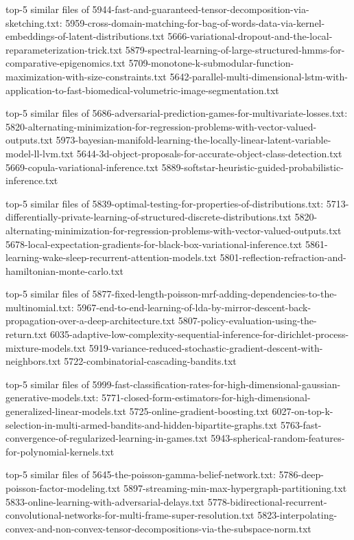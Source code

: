 \documentclass[11pt]{article}
\begin{document}
top-5 similar files of
5944-fast-and-guaranteed-tensor-decomposition-via-sketching.txt:
5959-cross-domain-matching-for-bag-of-words-data-via-kernel-embeddings-of-latent-distributions.txt
5666-variational-dropout-and-the-local-reparameterization-trick.txt
5879-spectral-learning-of-large-structured-hmms-for-comparative-epigenomics.txt
5709-monotone-k-submodular-function-maximization-with-size-constraints.txt
5642-parallel-multi-dimensional-lstm-with-application-to-fast-biomedical-volumetric-image-segmentation.txt

top-5 similar files of
5686-adversarial-prediction-games-for-multivariate-losses.txt:
5820-alternating-minimization-for-regression-problems-with-vector-valued-outputs.txt
5973-bayesian-manifold-learning-the-locally-linear-latent-variable-model-ll-lvm.txt
5644-3d-object-proposals-for-accurate-object-class-detection.txt
5669-copula-variational-inference.txt
5889-softstar-heuristic-guided-probabilistic-inference.txt

top-5 similar files of
5839-optimal-testing-for-properties-of-distributions.txt:
5713-differentially-private-learning-of-structured-discrete-distributions.txt
5820-alternating-minimization-for-regression-problems-with-vector-valued-outputs.txt
5678-local-expectation-gradients-for-black-box-variational-inference.txt
5861-learning-wake-sleep-recurrent-attention-models.txt
5801-reflection-refraction-and-hamiltonian-monte-carlo.txt

top-5 similar files of
5877-fixed-length-poisson-mrf-adding-dependencies-to-the-multinomial.txt:
5967-end-to-end-learning-of-lda-by-mirror-descent-back-propagation-over-a-deep-architecture.txt
5807-policy-evaluation-using-the-return.txt
6035-adaptive-low-complexity-sequential-inference-for-dirichlet-process-mixture-models.txt
5919-variance-reduced-stochastic-gradient-descent-with-neighbors.txt
5722-combinatorial-cascading-bandits.txt

top-5 similar files of
5999-fast-classification-rates-for-high-dimensional-gaussian-generative-models.txt:
5771-closed-form-estimators-for-high-dimensional-generalized-linear-models.txt
5725-online-gradient-boosting.txt
6027-on-top-k-selection-in-multi-armed-bandits-and-hidden-bipartite-graphs.txt
5763-fast-convergence-of-regularized-learning-in-games.txt
5943-spherical-random-features-for-polynomial-kernels.txt

top-5 similar files of 5645-the-poisson-gamma-belief-network.txt:
5786-deep-poisson-factor-modeling.txt
5897-streaming-min-max-hypergraph-partitioning.txt
5833-online-learning-with-adversarial-delays.txt
5778-bidirectional-recurrent-convolutional-networks-for-multi-frame-super-resolution.txt
5823-interpolating-convex-and-non-convex-tensor-decompositions-via-the-subspace-norm.txt
\end{document}
